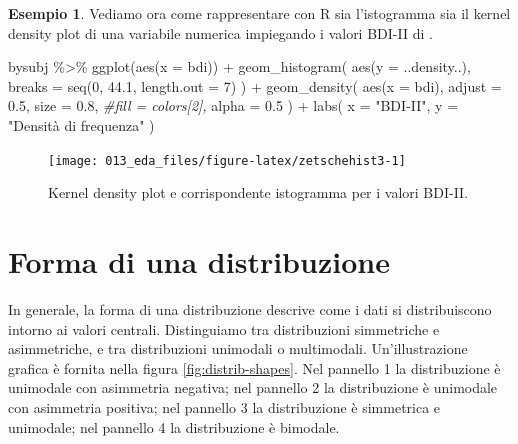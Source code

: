 \documentclass[
  10pt,
  italian,
  a4paper,
  extrafontsizes,onecolumn,openright
  ]{memoir}
\newenvironment{Shaded}{\begin{snugshade}}{\end{snugshade}}
\newcommand{\AttributeTok}[1]{\textcolor[rgb]{0.77,0.63,0.00}{#1}}
\newcommand{\CommentTok}[1]{\textcolor[rgb]{0.56,0.35,0.01}{\textit{#1}}}
\newcommand{\DecValTok}[1]{\textcolor[rgb]{0.00,0.00,0.81}{#1}}
\newcommand{\FloatTok}[1]{\textcolor[rgb]{0.00,0.00,0.81}{#1}}
\newcommand{\FunctionTok}[1]{\textcolor[rgb]{0.00,0.00,0.00}{#1}}
\newcommand{\NormalTok}[1]{#1}
\newcommand{\SpecialCharTok}[1]{\textcolor[rgb]{0.00,0.00,0.00}{#1}}
\newcommand{\StringTok}[1]{\textcolor[rgb]{0.31,0.60,0.02}{#1}}
\theoremstyle{definition}
\theoremstyle{definition}
\newtheorem{example}{Esempio}[chapter]
\theoremstyle{definition}
\theoremstyle{definition}
\theoremstyle{remark}
\begin{document}
\begin{example}

Vediamo ora come rappresentare con R sia l'istogramma sia il kernel density plot di una variabile numerica impiegando i valori BDI-II di \textcite{zetschefuture2019}.

\begin{Shaded}
\begin{Highlighting}[]
\NormalTok{bysubj }\SpecialCharTok{\%\textgreater{}\%} 
  \FunctionTok{ggplot}\NormalTok{(}\FunctionTok{aes}\NormalTok{(}\AttributeTok{x =}\NormalTok{ bdi)) }\SpecialCharTok{+}
  \FunctionTok{geom\_histogram}\NormalTok{(}
    \FunctionTok{aes}\NormalTok{(}\AttributeTok{y =}\NormalTok{ ..density..), }
    \AttributeTok{breaks =} \FunctionTok{seq}\NormalTok{(}\DecValTok{0}\NormalTok{, }\FloatTok{44.1}\NormalTok{, }\AttributeTok{length.out =} \DecValTok{7}\NormalTok{)}
\NormalTok{  ) }\SpecialCharTok{+}
  \FunctionTok{geom\_density}\NormalTok{(}
    \FunctionTok{aes}\NormalTok{(}\AttributeTok{x =}\NormalTok{ bdi), }
    \AttributeTok{adjust =} \FloatTok{0.5}\NormalTok{, }
    \AttributeTok{size =} \FloatTok{0.8}\NormalTok{, }
    \CommentTok{\#fill = colors[2],}
    \AttributeTok{alpha =} \FloatTok{0.5}
\NormalTok{  ) }\SpecialCharTok{+}
  \FunctionTok{labs}\NormalTok{(}
    \AttributeTok{x =} \StringTok{"BDI{-}II"}\NormalTok{,}
    \AttributeTok{y =} \StringTok{"Densità di frequenza"}
\NormalTok{  ) }
\end{Highlighting}
\end{Shaded}

\begin{figure}[h]

{\centering \texttt{[image: 013\_eda\_files/figure-latex/zetschehist3-1]} 

}

\caption{Kernel density plot e corrispondente istogramma per i valori BDI-II.}\label{fig:zetschehist3}
\end{figure}

\end{example}

\hypertarget{forma-di-una-distribuzione}{%
\section{Forma di una distribuzione}\label{forma-di-una-distribuzione}}

In generale, la forma di una distribuzione descrive come i dati si distribuiscono intorno ai valori centrali. Distinguiamo tra distribuzioni simmetriche e asimmetriche, e tra distribuzioni unimodali o multimodali. Un'illustrazione grafica è fornita nella figura \ref{fig:distrib-shapes}. Nel pannello 1 la distribuzione è unimodale con asimmetria negativa; nel pannello 2 la distribuzione è unimodale con asimmetria positiva; nel pannello 3 la distribuzione è simmetrica e unimodale; nel pannello 4 la distribuzione è bimodale.
\end{document}
